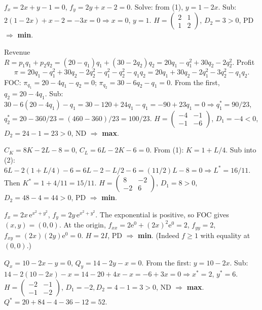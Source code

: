 \begin{solutions}
    \item $f_x = 2 x + y - 1 = 0$, $f_y = 2 y + x - 2 = 0$. Solve: from (1), $y = 1 - 2 x$. Sub: $2(1 - 2 x) + x - 2 = -3 x = 0 \Rightarrow x = 0$, $y = 1$. $H = \begin{pmatrix} 2 & 1 \\ 1 & 2 \end{pmatrix}$, $D_2 = 3 > 0$, PD $\Rightarrow$ \textbf{min}.
    \item Revenue $R = p_1 q_1 + p_2 q_2 = (20 - q_1) q_1 + (30 - 2 q_2) q_2 = 20 q_1 - q_1^2 + 30 q_2 - 2 q_2^2$. Profit
    \[\pi = 20 q_1 - q_1^2 + 30 q_2 - 2 q_2^2 - q_1^2 - q_2^2 - q_1 q_2 = 20 q_1 + 30 q_2 - 2 q_1^2 - 3 q_2^2 - q_1 q_2.\]
    FOC: $\pi_{q_1} = 20 - 4 q_1 - q_2 = 0$; $\pi_{q_2} = 30 - 6 q_2 - q_1 = 0$. From the first, $q_2 = 20 - 4 q_1$. Sub: $30 - 6(20 - 4 q_1) - q_1 = 30 - 120 + 24 q_1 - q_1 = -90 + 23 q_1 = 0 \Rightarrow q_1^* = 90/23$, $q_2^* = 20 - 360/23 = (460 - 360)/23 = 100/23$.
    $H = \begin{pmatrix} -4 & -1 \\ -1 & -6 \end{pmatrix}$, $D_1 = -4 < 0$, $D_2 = 24 - 1 = 23 > 0$, ND $\Rightarrow$ \textbf{max}.
    \item $C_K = 8 K - 2 L - 8 = 0$, $C_L = 6 L - 2 K - 6 = 0$. From (1): $K = 1 + L/4$. Sub into (2): $6 L - 2(1 + L/4) - 6 = 6 L - 2 - L/2 - 6 = (11/2) L - 8 = 0 \Rightarrow L^* = 16/11$. Then $K^* = 1 + 4/11 = 15/11$. $H = \begin{pmatrix} 8 & -2 \\ -2 & 6 \end{pmatrix}$, $D_1 = 8 > 0$, $D_2 = 48 - 4 = 44 > 0$, PD $\Rightarrow$ \textbf{min}.
    \item $f_x = 2 x \, \mathrm{e}^{x^2 + y^2}$, $f_y = 2 y \, \mathrm{e}^{x^2 + y^2}$. The exponential is positive, so FOC gives $(x, y) = (0, 0)$. At the origin, $f_{xx} = 2 \mathrm{e}^0 + (2 x)^2 \mathrm{e}^0 = 2$, $f_{yy} = 2$, $f_{xy} = (2 x)(2 y) \mathrm{e}^0 = 0$. $H = 2 I$, PD $\Rightarrow$ \textbf{min}. (Indeed $f \geq 1$ with equality at $(0,0)$.)
    \item $Q_x = 10 - 2 x - y = 0$, $Q_y = 14 - 2 y - x = 0$. From the first: $y = 10 - 2 x$. Sub: $14 - 2(10 - 2 x) - x = 14 - 20 + 4 x - x = -6 + 3 x = 0 \Rightarrow x^* = 2$, $y^* = 6$. $H = \begin{pmatrix} -2 & -1 \\ -1 & -2 \end{pmatrix}$, $D_1 = -2, D_2 = 4 - 1 = 3 > 0$, ND $\Rightarrow$ \textbf{max}. $Q^* = 20 + 84 - 4 - 36 - 12 = 52$.

\end{solutions}
